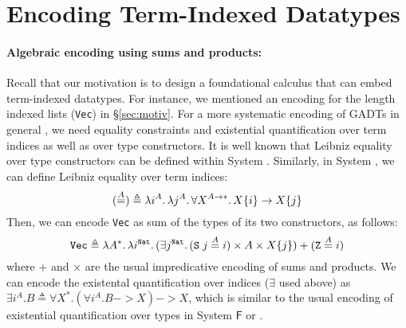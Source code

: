 \section{Encoding Term-Indexed Datatypes} \label{sec:data}
\paragraph{Algebraic encoding using sums and products:}
Recall that our motivation is to design a foundational calculus
that can embed term-indexed datatypes. For instance, we mentioned
an encoding for the length indexed lists ({\small\tt Vec}) in \S\ref{sec:motiv}.
For a more systematic encoding of GADTs in general
\cite{Sheard04equality,crary98intensional},
we need  equality constraints and existential quantification
over term indices as well as over type constructors.
It is well known that Leibniz equality over type constructors
can be defined within System \Fw. %
Similarly, in System \Fi, we can define Leibniz equality over term indices:
\[
(\stackrel{A}{=}) \triangleq
	\lambda i^A.\, \lambda j^A.\, \forall X^{A\to*}.\, X\{i\}\to X\{j\}
\]
Then, we can encode {\small\tt Vec} as sum of the types of its two constructors,
as follows:
\[ \mathtt{Vec} \triangleq \lambda A^{*}.\,\lambda i^\texttt{Nat}.\,
	(\exists j^\texttt{Nat}.\,(\texttt{S}\;j\stackrel{A}{=}i)\times A \times X\{j\})
	+
	(\texttt{Z}\stackrel{A}{=}i)
\]
where $+$ and $\times$ are the usual impredicative encoding of sums
and products. We can encode the existental quantification over indices
($\exists$ used above) as
$ \exists i^A.B \triangleq \forall X^{*}. (\forall i^A.B -> X) -> X $,
which is similar to the usual encoding of existential quantification
over types in System $\mathsf{F}$ or \Fw.

